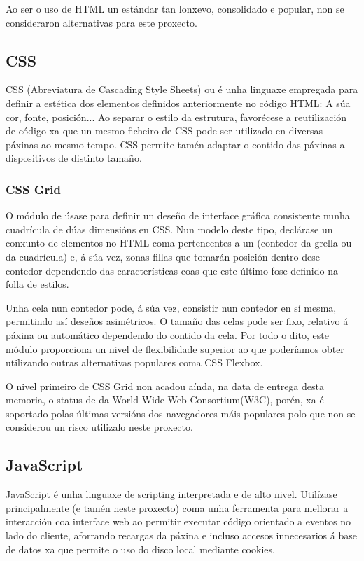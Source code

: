 Ao ser o uso de HTML un estándar tan lonxevo, consolidado e popular, non se consideraron alternativas para este proxecto.


\subsection{CSS}

CSS (Abreviatura de Cascading Style Sheets) ou  é unha linguaxe empregada para definir a estética dos elementos definidos anteriormente no código HTML: A súa cor, fonte, posición... Ao separar o estilo da estrutura, favorécese a reutilización de código xa que un mesmo ficheiro de CSS pode ser utilizado en diversas páxinas ao mesmo tempo. CSS permite tamén adaptar o contido das páxinas a dispositivos de distinto tamaño\cite{css_w3c}.

\subsubsection{CSS Grid}
\label{cssgrid}

O módulo de  úsase para definir un deseño de interface gráfica consistente nunha cuadrícula de dúas dimensións en CSS. Nun modelo deste tipo, declárase un conxunto de elementos no HTML coma pertencentes a un (contedor da grella ou da cuadrícula) e, á súa vez, zonas fillas que tomarán posición dentro dese contedor dependendo das características coas que este último fose definido na folla de estilos.

Unha cela nun contedor pode, á súa vez, consistir nun contedor en sí mesma, permitindo así deseños asimétricos. O tamaño das celas pode ser fixo, relativo á páxina ou automático dependendo do contido da cela. Por todo o dito, este módulo proporciona un nivel de flexibilidade superior ao que poderíamos obter utilizando outras alternativas populares coma CSS Flexbox. 

O nivel primeiro de CSS Grid non acadou aínda, na data de entrega desta memoria, o status de  da  World Wide Web Consortium(W3C)\cite{css_grid_w3c}, porén, xa é soportado polas últimas versións dos navegadores máis populares\cite{css_grid_w3c2} polo que non se considerou un risco utilizalo neste proxecto.

\subsection{JavaScript}

JavaScript é unha linguaxe de scripting interpretada e de alto nivel. Utilízase principalmente (e tamén neste proxecto) coma unha ferramenta para mellorar a interacción coa interface web ao permitir executar código orientado a eventos no lado do cliente, aforrando recargas da páxina e incluso accesos innecesarios á base de datos xa que permite o uso do disco local mediante cookies. 

